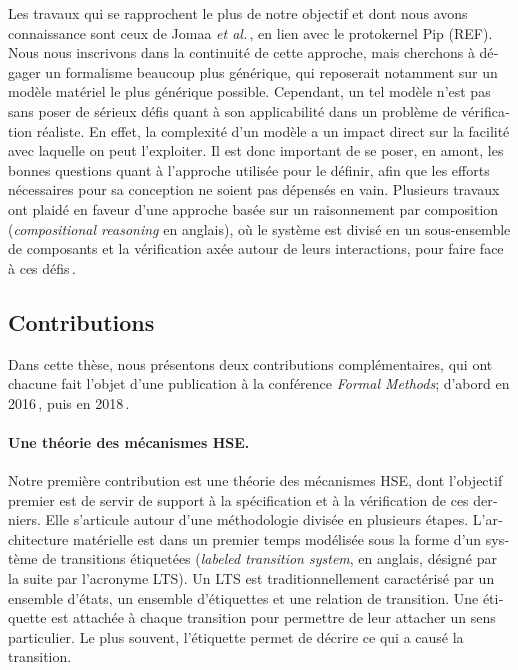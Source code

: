 \begin{otherlanguage}{french}
  Les travaux qui se rapprochent le plus de notre objectif et dont nous avons
  connaissance sont ceux de Jomaa \emph{et al.}\,\cite{jomaa2016mmu}, en lien
  avec le protokernel Pip (REF). 
  Nous nous inscrivons dans la continuité de cette approche, mais cherchons à
  dégager un formalisme beaucoup plus générique, qui reposerait notamment sur un
  modèle matériel le plus générique possible.
  Cependant, un tel modèle n’est pas sans poser de sérieux défis quant à son
  applicabilité dans un problème de vérification réaliste.
  En effet, la complexité d’un modèle a un impact direct sur la facilité avec
  laquelle on peut l’exploiter.
  Il est donc important de se poser, en amont, les bonnes questions quant à
  l’approche utilisée pour le définir, afin que les efforts nécessaires pour sa
  conception ne soient pas dépensés en vain.
  Plusieurs travaux ont plaidé en faveur d’une approche basée sur un
  raisonnement par composition (\emph{compositional reasoning} en anglais), où
  le système est divisé en un sous-ensemble de composants et la vérification
  axée autour de leurs interactions, pour faire face à ces
  défis\,\cite{garg2010compositional,heyman2012securemodel}.

  \subsection*{Contributions}

  Dans cette thèse, nous présentons deux contributions complémentaires, qui ont
  chacune fait l’objet d’une publication à la conférence \emph{Formal Methods};
  d’abord en 2016\,\cite{letan2016speccert}, puis en
  2018\,\cite{letan2018freespec}.

  \paragraph{Une théorie des mécanismes HSE.}
  Notre première contribution est une théorie des mécanismes HSE, dont
  l’objectif premier est de servir de support à la spécification et à la
  vérification de ces derniers.
  Elle s’articule autour d’une méthodologie divisée en plusieurs étapes.
  L’architecture matérielle est dans un premier temps modélisée sous la forme
  d’un système de transitions étiquetées (\emph{labeled transition system}, en
  anglais, désigné par la suite par l’acronyme LTS).
  Un LTS est traditionnellement caractérisé par un ensemble d’états, un ensemble
  d’étiquettes et une relation de transition.
  Une étiquette est attachée à chaque transition pour permettre de leur attacher
  un sens particulier. 
  Le plus souvent, l’étiquette permet de décrire ce qui a causé la transition.
  

\end{otherlanguage}
